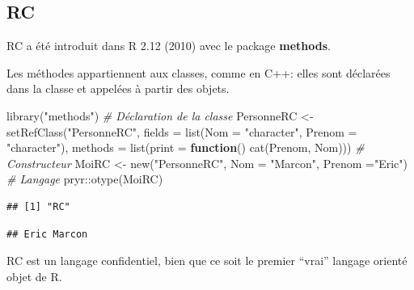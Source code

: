 \documentclass[
  11pt,
  french,
  a4paper,
  extrafontsizes,onecolumn,openright
  ]{memoir}
\newenvironment{Shaded}{\begin{snugshade}}{\end{snugshade}}
\newcommand{\AttributeTok}[1]{\textcolor[rgb]{0.77,0.63,0.00}{#1}}
\newcommand{\CommentTok}[1]{\textcolor[rgb]{0.56,0.35,0.01}{\textit{#1}}}
\newcommand{\ControlFlowTok}[1]{\textcolor[rgb]{0.13,0.29,0.53}{\textbf{#1}}}
\newcommand{\FunctionTok}[1]{\textcolor[rgb]{0.00,0.00,0.00}{#1}}
\newcommand{\NormalTok}[1]{#1}
\newcommand{\OtherTok}[1]{\textcolor[rgb]{0.56,0.35,0.01}{#1}}
\newcommand{\SpecialCharTok}[1]{\textcolor[rgb]{0.00,0.00,0.00}{#1}}
\newcommand{\StringTok}[1]{\textcolor[rgb]{0.31,0.60,0.02}{#1}}
\begin{document}
\hypertarget{rc}{%
\subsection{RC}\label{rc}}

RC a été introduit dans R 2.12 (2010) avec le package \textbf{methods}.

Les méthodes appartiennent aux classes, comme en C++: elles sont déclarées dans la classe et appelées à partir des objets.

\scriptsize

\begin{Shaded}
\begin{Highlighting}[]
\FunctionTok{library}\NormalTok{(}\StringTok{"methods"}\NormalTok{)}
\CommentTok{\# Déclaration de la classe}
\NormalTok{PersonneRC }\OtherTok{\textless{}{-}} \FunctionTok{setRefClass}\NormalTok{(}\StringTok{"PersonneRC"}\NormalTok{, }
    \AttributeTok{fields =} \FunctionTok{list}\NormalTok{(}\AttributeTok{Nom =} \StringTok{"character"}\NormalTok{, }\AttributeTok{Prenom =} \StringTok{"character"}\NormalTok{),}
    \AttributeTok{methods =} \FunctionTok{list}\NormalTok{(}\AttributeTok{print =} \ControlFlowTok{function}\NormalTok{() }\FunctionTok{cat}\NormalTok{(Prenom, Nom)))}
\CommentTok{\# Constructeur}
\NormalTok{MoiRC }\OtherTok{\textless{}{-}} \FunctionTok{new}\NormalTok{(}\StringTok{"PersonneRC"}\NormalTok{, }\AttributeTok{Nom =} \StringTok{"Marcon"}\NormalTok{, }\AttributeTok{Prenom =}\StringTok{"Eric"}\NormalTok{)}
\CommentTok{\# Langage}
\NormalTok{pryr}\SpecialCharTok{::}\FunctionTok{otype}\NormalTok{(MoiRC)}
\end{Highlighting}
\end{Shaded}

\begin{verbatim}
## [1] "RC"
\end{verbatim}

\begin{Shaded}
\end{Shaded}

\begin{verbatim}
## Eric Marcon
\end{verbatim}

\normalsize

RC est un langage confidentiel, bien que ce soit le premier ``vrai'' langage orienté objet de R.
\end{document}
